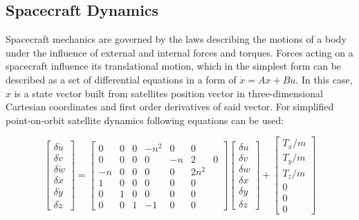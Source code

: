 \clearpage
\subsection{Spacecraft Dynamics}\label{sec:space_mechanics}
    Spacecraft mechanics are governed by the laws describing the motions of a body under the influence of external and internal forces and torques. Forces acting on a spacecraft influence its translational motion, which in the simplest form can be described as a set of differential equations in a form of $\dot{x} = Ax + Bu$. In this case, $x$ is a state vector built from satellites position vector in three-dimensional Cartesian coordinates and first order derivatives of said vector. For simplified point-on-orbit satellite dynamics following equations can be used:
    
    \begin{equation}
        \begin{bmatrix}  \delta\dot{u} \\ \delta\dot{v} \\ \delta\dot{w} \\ \delta\dot{x} \\ \delta\dot{y} \\ \delta\dot{z} \end{bmatrix}
        =
        \begin{bmatrix}
        0 & 0 & 0 & -n^2 & 0 & 0 \\
        0 & 0 & 0 & 0 & -n&2 & 0 \\
        -n & 0 & 0 & 0 & 0 & 2n^2 \\
        1 & 0 & 0 & 0 & 0 & 0 \\
        0 & 1 & 0 & 0 & 0 & 0 \\
        0 & 0 & 1 & -1 & 0 & 0
        \end{bmatrix}
        \begin{bmatrix}  \delta u \\ \delta v \\ \delta w \\ \delta x \\ \delta y \\ \delta z \end{bmatrix}
        +
        \begin{bmatrix}
        T_x/m \\
        T_y/m \\
        T_z/m \\
        0 \\
        0 \\
        0
        \end{bmatrix}
    \end{equation}\label{eqn:sstranslation}


